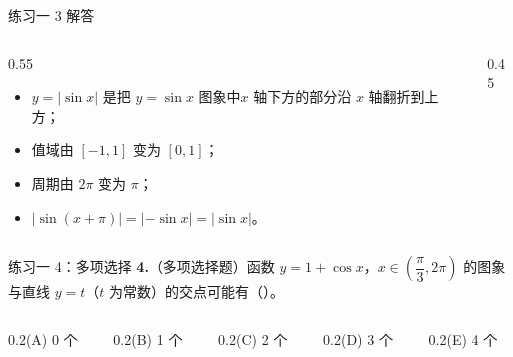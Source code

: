 \documentclass[10pt,aspectratio=169,serif]{beamer}
\begin{document}
\begin{frame}[t]{练习一 3 解答}
\begin{columns}
\begin{column}{0.55\textwidth}
\begin{tcolorbox}[colback=orange!10,colframe=orange,title=\textbf{解}]
\begin{itemize}
  \item $y=|\sin x|$ 是把 $y=\sin x$ 图象中\alert{$x$ 轴下方的部分沿 $x$ 轴翻折到上方}；
  \item 值域由 $[-1,1]$ 变为 $[0,1]$；
  \item 周期由 $2\pi$ 变为 $\pi$；
  \item $|\sin(x+\pi)|=|-\sin x|=|\sin x|$。
\end{itemize}
\end{tcolorbox}
\end{column}
\begin{column}{0.45\textwidth}
\end{column}
\end{columns}
\end{frame}

\begin{frame}[t]{练习一 4：多项选择}
\textbf{4.}（多项选择题）函数 $y=1+\cos x$，$x\in\!\left(\dfrac{\pi}{3},2\pi\right)$ 的图象与直线 $y=t$（$t$ 为常数）的交点可能有（\quad ）。

\vspace{1em}
\begin{columns}
\begin{column}{0.2\textwidth}{(A) 0 个}\end{column}
\begin{column}{0.2\textwidth}{(B) 1 个}\end{column}
\begin{column}{0.2\textwidth}{(C) 2 个}\end{column}
\begin{column}{0.2\textwidth}{(D) 3 个}\end{column}
\begin{column}{0.2\textwidth}{(E) 4 个}\end{column}
\end{columns}
\end{frame}
\end{document}
